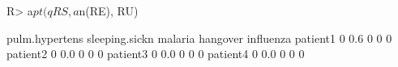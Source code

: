\begin{Schunk}
% --begin: "comp.quant.combined"
\begin{Sinput}
R> a$pt(qRS, a$n(RE), RU)
\end{Sinput}
\begin{Soutput}
         pulm.hypertens sleeping.sickn malaria hangover influenza
patient1              0            0.6       0        0         0
patient2              0            0.0       0        0         0
patient3              0            0.0       0        0         0
patient4              0            0.0       0        0         0
\end{Soutput}
%
% --end: "comp.quant.combined"
\end{Schunk}
